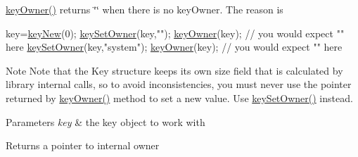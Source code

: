 \hyperlink{group__keyname_gaf6485fb8599714b6bbd830cf915ffea5}{key\-Owner()} returns \char`\"{}\char`\"{} when there is no key\-Owner. The reason is 
\begin{DoxyCode}
key=\hyperlink{group__key_gad23c65b44bf48d773759e1f9a4d43b89}{keyNew}(0);
\hyperlink{group__keyname_ga88d6ec200ba0707b7c1b4a88133d2be4}{keySetOwner}(key,\textcolor{stringliteral}{""});
\hyperlink{group__keyname_gaf6485fb8599714b6bbd830cf915ffea5}{keyOwner}(key); \textcolor{comment}{// you would expect "" here}
\hyperlink{group__keyname_ga88d6ec200ba0707b7c1b4a88133d2be4}{keySetOwner}(key,\textcolor{stringliteral}{"system"});
\hyperlink{group__keyname_gaf6485fb8599714b6bbd830cf915ffea5}{keyOwner}(key); \textcolor{comment}{// you would expect "" here}
\end{DoxyCode}


\begin{DoxyNote}{Note}
Note that the Key structure keeps its own size field that is calculated by library internal calls, so to avoid inconsistencies, you must never use the pointer returned by \hyperlink{group__keyname_gaf6485fb8599714b6bbd830cf915ffea5}{key\-Owner()} method to set a new value. Use \hyperlink{group__keyname_ga88d6ec200ba0707b7c1b4a88133d2be4}{key\-Set\-Owner()} instead.
\end{DoxyNote}

\begin{DoxyParams}{Parameters}
{\em key} & the key object to work with \\
\hline
\end{DoxyParams}
\begin{DoxyReturn}{Returns}
a pointer to internal owner 
\end{DoxyReturn}

